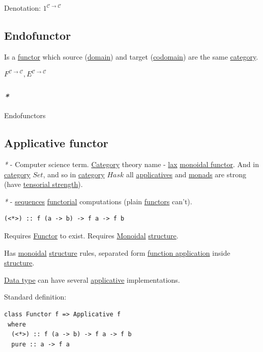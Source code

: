 \documentclass[a4paper,14pt,oneside]{book}
\begin{document}
Denotation:
\(1^{\mathcal{C \to C}}\)

\subsection{\label{org51b87cf}Endofunctor}
\label{sec:orga997213}
Is a \hyperref[org878310f]{functor} which source (\hyperref[org96f0f5e]{domain}) and target (\hyperref[orgbabad84]{codomain}) are the same \hyperref[org77f032a]{category}.

\(F^{\mathcal{C \to C}}, E^{\mathcal{C \to C}}\)

\subsubsection{\emph{*}}
\label{sec:org488f434}

\label{orgdb546c0}Endofunctors

\subsection{\label{org4637572}Applicative functor}
\label{sec:org07bf801}
\emph{*} - Computer science term. \hyperref[org77f032a]{Category} theory name - \hyperref[org975622b]{lax} \hyperref[org09ddbf8]{monoidal functor}. And in \hyperref[org77f032a]{category} \(Set\), and so in \hyperref[org77f032a]{category} \(Hask\) all \hyperref[org38373d1]{applicatives} and \hyperref[org3fa5862]{monads} are strong (have \hyperref[orgbca9167]{tensorial strength}).

\emph{*} - \hyperref[org09c7588]{sequences} \hyperref[orgf057372]{functorial} computations (plain \hyperref[org5151aa8]{functors} can't).

\begin{verbatim}
(<*>) :: f (a -> b) -> f a -> f b
\end{verbatim}

Requires \hyperref[org878310f]{Functor} to exist.
Requires \hyperref[orgb14748b]{Monoidal} \hyperref[org156091f]{structure}.

Has \hyperref[orgb14748b]{monoidal} \hyperref[org156091f]{structure} rules, separated form \hyperref[org3337eca]{function application} inside \hyperref[org156091f]{structure}.

\hyperref[orgfb0c5b6]{Data type} can have several \hyperref[orge473e43]{applicative} implementations.

Standard definition:
\begin{verbatim}
class Functor f => Applicative f
 where
  (<*>) :: f (a -> b) -> f a -> f b
  pure :: a -> f a
\end{verbatim}
\end{document}
